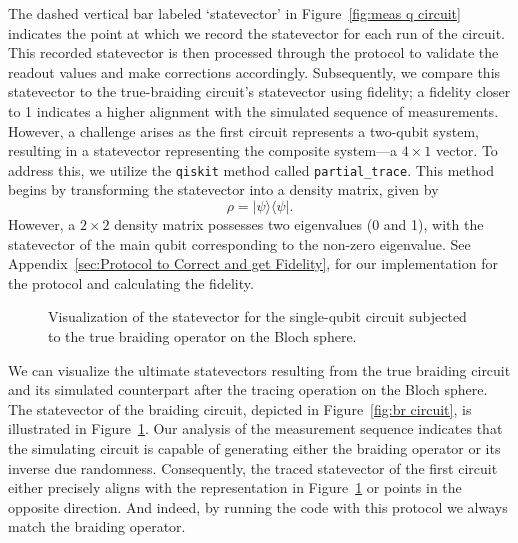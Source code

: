\documentclass{article}
\begin{document}
The dashed vertical bar labeled `statevector' in Figure~\ref{fig:meas q circuit} indicates the point at which we record the statevector for each run of the circuit. This recorded statevector is then processed through the protocol to validate the readout values and make corrections accordingly. Subsequently, we compare this statevector to the true-braiding circuit's statevector using fidelity; a fidelity closer to 1 indicates a higher alignment with the simulated sequence of measurements. However, a challenge arises as the first circuit represents a two-qubit system, resulting in a statevector representing the composite system—a \(4 \times 1\) vector. To address this, we utilize the \texttt{qiskit} method called \texttt{partial\_trace}. This method begins by transforming the statevector into a density matrix, given by 
\[\rho = | \psi \rangle \langle \psi | .\]
However, a \(2 \times 2\) density matrix possesses two eigenvalues (0 and 1), with the statevector of the main qubit corresponding to the non-zero eigenvalue. See Appendix~\ref{sec:Protocol to Correct and get Fidelity}, for our implementation for the protocol and calculating the fidelity.
\begin{figure}
  \begin{center}
    
  \end{center}
  \caption{Visualization of the statevector for the single-qubit circuit subjected to the true braiding operator on the Bloch sphere.}\label{fig:br in bloch}
\end{figure}
We can visualize the ultimate statevectors resulting from the true braiding circuit and its simulated counterpart after the tracing operation on the Bloch sphere. The statevector of the braiding circuit, depicted in Figure~\ref{fig:br circuit}, is illustrated in Figure~\ref{fig:br in bloch}. Our analysis of the measurement sequence indicates that the simulating circuit is capable of generating either the braiding operator or its inverse due randomness. Consequently, the traced statevector of the first circuit either precisely aligns with the representation in Figure~\ref{fig:br in bloch} or points in the opposite direction. And indeed, by running the code with this protocol we always match the braiding operator.
\end{document}
